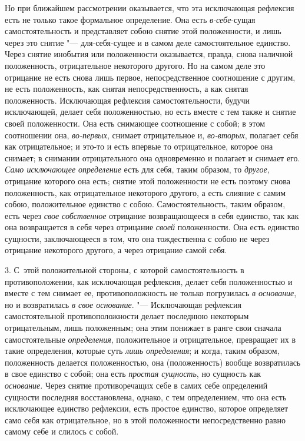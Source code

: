 Но при ближайшем рассмотрении оказывается, что эта исключающая рефлексия
есть не только такое формальное определение. Она есть
{\em в-себе}{}-сущая самостоятельность и представляет
собою снятие этой положенности, и лишь через это снятие "--- для-себя-сущее и
в самом деле самостоятельное единство. Через снятие инобытия или
положенности оказывается, правда, снова наличной положенность,
отрицательное некоторого другого. Но на самом деле это отрицание не есть
снова лишь первое, непосредственное соотношение с другим, не есть
положенность, как снятая непосредственность, а как снятая положенность.
Исключающая рефлексия самостоятельности, будучи исключающей, делает себя
положенностью, но есть вместе с тем также и снятие своей положенности. Она
есть снимающее соотношение с собой; в этом соотношении она,
{\em во-первых}, снимает отрицательное и,
{\em во-вторых}, полагает себя как отрицательное; и
это-то и есть впервые то отрицательное, которое она снимает; в снимании
отрицательного она одновременно и полагает и снимает его.
{\em Само исключающее определение} есть для себя, таким
образом, то {\em другое}, отрицание которого она есть;
снятие этой положенности не есть поэтому снова положенность, как
отрицательное некоторого другого, а есть слияние с самим собою,
положительное единство с собою. Самостоятельность, таким образом, есть
через {\em свое собственное} отрицание возвращающееся в
себя единство, так как она возвращается в себя через отрицание
{\em своей} положенности. Она есть единство сущности,
заключающееся в том, что она тождественна с собою не через отрицание
некоторого другого, а через отрицание самой себя.

3. С~этой положительной стороны, с которой самостоятельность в
противоположении, как исключающая рефлексия, делает себя положенностью и
вместе с тем снимает ее, противоположность не только погрузилась
{\em в основание}, но и возвратилась
{\em в свое основание}. "--- Исключающая рефлексия
самостоятельной противоположности делает последнюю некоторым отрицательным,
лишь положенным; она этим понижает в ранге свои сначала самостоятельные
{\em определения}, положительное и отрицательное,
превращает их в такие определения, которые суть
{\em лишь определения}; и когда, таким образом,
положенность делается положенностью, она (положенность) вообще возвратилась
в свое единство с собой; она есть {\em простая
сущность}, но сущность как {\em основание}. Через
снятие противоречащих себе в самих себе определений сущности последняя
восстановлена, однако, с тем определением, что она есть исключающее
единство рефлексии, есть простое единство, которое определяет само себя как
отрицательное, но в этой положенности непосредственно равно самому себе и
слилось с собой.

